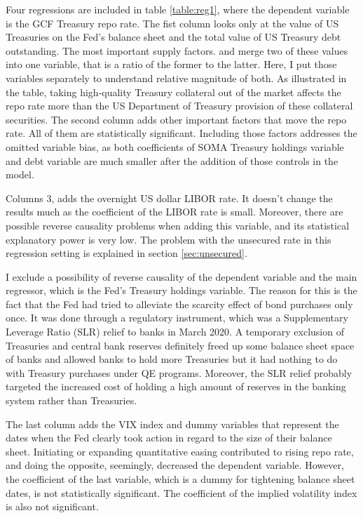 \documentclass[11pt,a4paper,english,oneside]{article}
\begin{document}
Four regressions are included in table \ref{table:reg1}, where the dependent variable is the GCF Treasury repo rate. The fist column looks only at the value of US Treasuries on the Fed's balance sheet and the total value of US Treasury debt outstanding. The most important supply factors. \citet{damico2014} and \citet{arrata2018} merge two of these values into one variable, that is a ratio of the former to the latter. Here, I put those variables separately to understand relative magnitude of both. As illustrated in the table, taking high-quality Treasury collateral out of the market affects the repo rate more than the US Department of Treasury provision of these collateral securities. The second column adds other important factors that move the repo rate. All of them are statistically significant. Including those factors addresses the omitted variable bias, as both coefficients of SOMA Treasury holdings variable and debt variable are much smaller after the addition of those controls in the model.

Columns 3, adds the overnight US dollar LIBOR rate. It doesn't change the results much as the coefficient of the LIBOR rate is small. Moreover, there are possible reverse causality problems when adding this variable, and its statistical explanatory power is very low. The problem with the unsecured rate in this regression setting is explained in section \ref{sec:unsecured}.

I exclude a possibility of reverse causality of the dependent variable and the main regressor, which is the Fed's Treasury holdings variable. The reason for this is the fact that the Fed had tried to alleviate the scarcity effect of bond purchases only once. It was done through a regulatory instrument, which was a Supplementary Leverage Ratio (SLR) relief to banks in March 2020. A temporary exclusion of Treasuries and central bank reserves definitely freed up some balance sheet space of banks and allowed banks to hold more Treasuries but it had nothing to do with Treasury purchases under QE programs. Moreover, the SLR relief probably targeted the increased cost of holding a high amount of reserves in the banking system rather than Treasuries.

The last column adds the VIX index and  dummy variables that represent the dates when the Fed clearly took action in regard to the size of their balance sheet. Initiating or expanding quantitative easing contributed to rising repo rate, and doing the opposite, seemingly, decreased the dependent variable. However, the coefficient of the last variable, which is a dummy for tightening balance sheet dates, is not statistically significant. The coefficient of the implied volatility index is also not significant.
\end{document}
